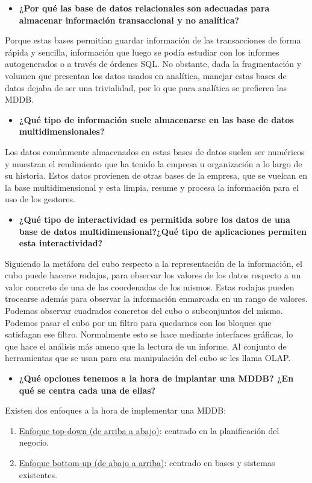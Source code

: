 \documentclass[paper=a4, fontsize=11pt]{scrartcl} %
\begin{document}
\begin{itemize}
\item \textbf{¿Por qué las base de datos relacionales son adecuadas para almacenar información transaccional y no analítica?}
\end{itemize}
Porque estas bases permitían guardar información de las transacciones de forma rápida y sencilla, información que luego se podía estudiar con los informes autogenerados o a través de órdenes SQL. No obstante, dada la fragmentación y volumen que presentan los datos usados en analítica, manejar estas bases de datos dejaba de ser una trivialidad, por lo que para analítica se prefieren las MDDB.

\begin{itemize}
\item \textbf{ ¿Qué tipo de información suele almacenarse en las base de datos multidimensionales?}
\end{itemize}
Los datos comúnmente almacenados en estas bases de datos suelen ser numéricos y muestran el rendimiento que ha tenido la empresa u organización a lo largo de su historia. Estos datos provienen de otras bases de la empresa, que se vuelcan en la base multidimensional y esta limpia, resume y procesa la información para el uso de los gestores.

\begin{itemize}
\item \textbf{ ¿Qué tipo de interactividad es permitida sobre los datos de una base de datos multidimensional?¿Qué tipo de aplicaciones permiten esta interactividad?}
\end{itemize}
Siguiendo la metáfora del cubo respecto a la representación de la información, el cubo puede hacerse rodajas, para observar los valores de los datos respecto a un valor concreto de una de las coordenadas de los mismos. Estas rodajas pueden trocearse además para observar la información enmarcada en un rango de valores. Podemos observar cuadrados concretos del cubo o subconjuntos del mismo. Podemos pasar el cubo por un filtro para quedarnos con los bloques que satisfagan ese filtro. Normalmente esto se hace mediante interfaces gráficas, lo que hace el análisis más ameno que la lectura de un informe. Al conjunto de herramientas que se usan para esa manipulación del cubo se les llama OLAP. 

\begin{itemize}
\item \textbf{¿Qué opciones tenemos a la hora de implantar una MDDB? ¿En qué se centra cada una de ellas?}
\end{itemize}
Existen dos enfoques a la hora de implementar una MDDB:
\begin{enumerate}
\item \underline{Enfoque top-down (de arriba a abajo)}: centrado en la planificación del negocio.
\item \underline{Enfoque bottom-up (de abajo a arriba)}: centrado en bases y sistemas existentes.
\end{enumerate}
\end{document}
